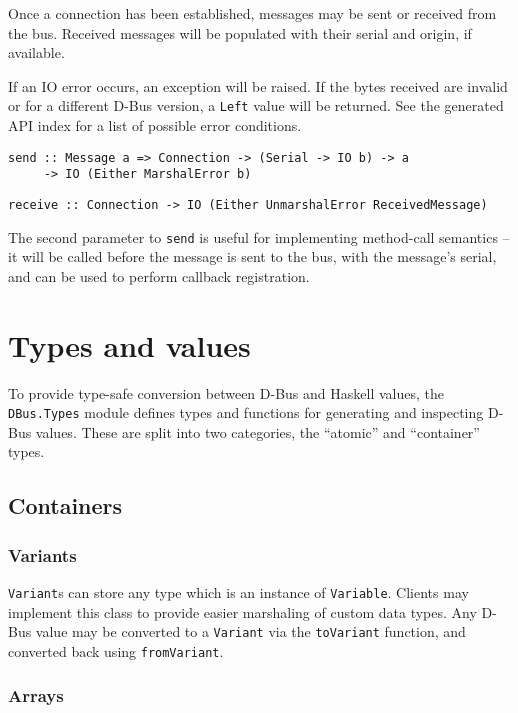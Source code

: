 \documentclass[12pt]{article}
\begin{document}
Once a connection has been established, messages may be sent or received
from the bus. Received messages will be populated with their serial and
origin, if available.

If an IO error occurs, an exception will be raised. If the bytes received
are invalid or for a different D-Bus version, a {\tt Left} value will be
returned. See the generated API index for a list of possible error
conditions.

\begin{verbatim}
send :: Message a => Connection -> (Serial -> IO b) -> a
     -> IO (Either MarshalError b)
\end{verbatim}
\begin{verbatim}
receive :: Connection -> IO (Either UnmarshalError ReceivedMessage)
\end{verbatim}

The second parameter to {\tt send} is useful for implementing method-call
semantics -- it will be called before the message is sent to the bus, with
the message's serial, and can be used to perform callback registration.

\section{Types and values}

To provide type-safe conversion between D-Bus and Haskell values, the
{\tt DBus.Types} module defines types and functions for generating and
inspecting D-Bus values. These are split into two categories, the
``atomic'' and ``container'' types.

\subsection{Containers}

\subsubsection{Variants}

{\tt Variant}s can store any type which is an instance of {\tt Variable}.
Clients may implement this class to provide easier marshaling of custom
data types. Any D-Bus value may be converted to a {\tt Variant} via the
{\tt toVariant} function, and converted back using {\tt fromVariant}.

\subsubsection{Arrays}
\end{document}
